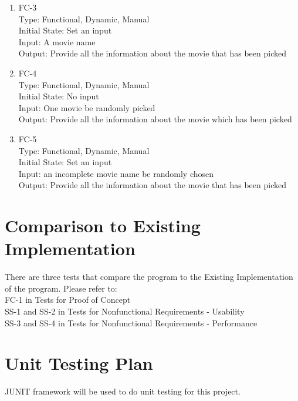 \documentclass[12pt, titlepage]{article}
\begin{document}
\begin{enumerate}
\item{FC-3}\\
Type:  Functional, Dynamic, Manual\\
Initial State: Set an input\\
Input: A movie name \\
Output: Provide all the information about the movie that has been picked


\item{FC-4\\}
Type:  Functional, Dynamic, Manual\\
Initial State: No input \\
Input: One movie be randomly picked\\
Output: Provide all the information about the movie which has been picked

\item{FC-5\\}
Type:  Functional, Dynamic, Manual\\
Initial State: Set an input\\
Input: an incomplete movie name be randomly chosen\\
Output: Provide all the information about the movie that has been picked
\end{enumerate}

\section{Comparison to Existing Implementation}	
There are three tests that compare the program to the Existing Implementation of the program. Please refer to:\\

FC-1 in Tests for Proof of Concept\\

SS-1 and SS-2 in Tests for Nonfunctional Requirements - Usability\\

SS-3 and SS-4 in Tests for Nonfunctional Requirements - Performance\\

				
\section{Unit Testing Plan}
JUNIT framework will be used to do unit testing for this project.
		
\end{document}
